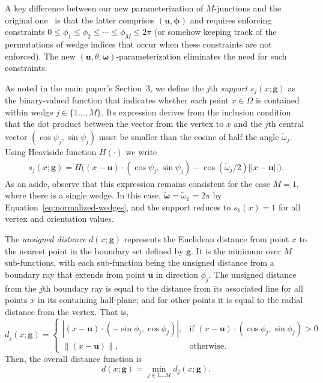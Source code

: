 \documentclass[main.tex]{subfiles}
\begin{document}
A key difference between our new parameterization of $M$-junctions and the original one~\cite{verbin2021field} is that the latter comprises $\left(\boldsymbol{u},\boldsymbol{\phi}\right)$ and requires enforcing constraints $0\le\phi_1\le\phi_2\le\cdots\le\phi_M\le2\pi$ (or somehow keeping track of the permutations of wedge indices that occur when these constraints are not enforced). The new $\left(\boldsymbol{u},\theta,\boldsymbol{\omega}\right)$-parameterization eliminates the need for such constraints.

As noted in the main paper's Section~3, we define the $j$th \emph{support} $s_{j}(x;\mathbf{g})$ as the binary-valued function that indicates whether each point $x\in\Omega$ is contained within wedge $j\in\{1\ldots,M\}$. Its expression derives from the inclusion condition that the dot product between the vector from the vertex to $x$ and the $j$th central vector  $\left(\cos\psi_j,\sin\psi_j \right)$ must be smaller than the cosine of half the angle $\tilde\omega_j$. Using Heaviside function $H(\cdot)$ we write
\begin{equation}\label{eq:wedge-indicator}
\begin{split}
s_j(x;\mathbf{g}) = 
H\Big((x-\mathbf{u})\cdot(\cos\psi_j,\sin\psi_j)
- \cos(\tilde{\omega}_j/2) ||x-\mathbf{u}|| \Big).
\end{split}
\end{equation}
As an aside, observe that this expression remains consistent for the case $M=1$, where there is a single wedge. In this case, $\tilde{\boldsymbol{\omega}}=\tilde{\omega}_1=2\pi$ by Equation~\ref{eq:normalized-wedges}, and the support reduces to $s_1(x)=1$ for all vertex and orientation values. 

The \emph{unsigned distance} $d(x;\mathbf{g})$ represents the Euclidean distance from point $x$ to the nearest point in the boundary set defined by $\mathbf{g}$. It is the minimum over $M$ sub-functions, with each sub-function being the unsigned distance from a boundary ray that extends from point $\mathbf{u}$ in direction $\phi_j$. The unsigned distance from the $j$th boundary ray is equal to the distance from its associated line for all points $x$ in its containing half-plane; and for other points it is equal to the radial distance from the vertex. That is,
\begin{equation}
    d_j(x;\mathbf{g}) = 
    \begin{cases}
    \left|(x-\mathbf{u})\cdot (-\sin\phi_j,\cos\phi_j)\right|,& \text{if } (x-\mathbf{u})\cdot (\cos\phi_j,\sin\phi_j) > 0\\
    \|(x-\mathbf{u})\|,&  \text{otherwise}.
    \end{cases}
\end{equation}
Then, the overall distance function is 
\begin{equation}
    d(x;\mathbf{g})=\min_{j\in{1\dots M}} d_j(x;\mathbf{g}).
\end{equation}
\end{document}

